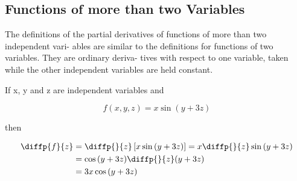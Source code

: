 \documentclass[12pt,a4paper]{article}
\begin{document}
\subsection{Functions of more than two Variables}

The definitions of the partial derivatives of functions of more than two independent vari-
ables are similar to the definitions for functions of two variables. They are ordinary deriva-
tives with respect to one variable, taken while the other independent variables are held
constant.


\begin{example}
    If x, y and z are independent variables and

    \[f(x,y,z) = x \sin{(y + 3z)}\]
    
    then

    \begin{align*}
        \diffp{f}{z} &= \diffp{}{z}\left[x \sin{(y + 3z)}\right] = x \diffp{}{z}\sin{(y + 3z)}\\
        &= \cos{(y + 3z)} \diffp{}{z} (y + 3z)\\
        &= 3x\cos{(y + 3z)} 
    \end{align*}
    

\end{example}

\newpage
\end{document}
